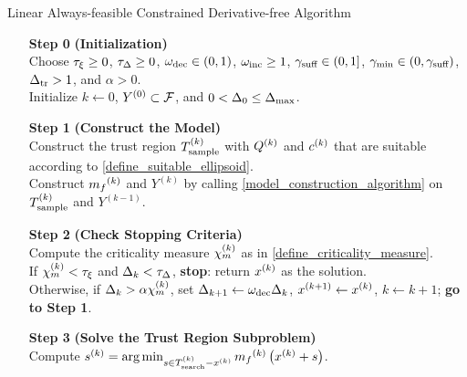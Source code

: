 \documentclass{article}
\begin{document}
{
\begin{fullwidth}[leftmargin=0in, rightmargin=0in, width=\linewidth-0.5in]
\begin{flushleft}

\begin{algorithm}[H]
    \caption{Linear Always-feasible Constrained Derivative-free Algorithm}
    \label{linearly_constrained_dfo_simple}
    \begin{itemize}
        \item[\textbf{Step 0}] \textbf{(Initialization)} \\
            Choose
            $\tau_{\xi}\ge 0$,
            $\tau_{\Delta} \ge 0$, 
            $\omega_{\text{dec}} \in (0,1)$, 
            $\omega_{\text{inc}} \ge 1$,  
            $ \gamma_{\textrm{suff}} \in (0,1]$, 
            $\gamma_{\textrm{min}} \in (0,\gamma_{\textrm{suff}})$,
            $\Delta_{\textrm{tr}} > 1$,
			and $\alpha > 0$. \\
            Initialize
            $k\gets 0$,
            $Y^{(0)} \subset {\mathcal F}$,
            and $0 < \Delta_0 \le {\Delta_{\textrm{max}}}$.
            
        \item[\textbf{Step 1}] \textbf{(Construct the Model)} \\
           Construct the trust region ${T_{\text{sample}}^{(k)}}$ with ${Q^{(k)}}$ and $c^{(k)}$ that are suitable according to \cref{define_suitable_ellipsoid}. \\
           Construct ${{m}_f}^{(k)}$ and $Y^{(k)}$ by calling \cref{model_construction_algorithm} on ${T_{\text{sample}}^{(k)}}$ and $Y^{(k-1)}$.
        
        \item[\textbf{Step 2}] \textbf{(Check Stopping Criteria)} \\
            Compute the criticality measure ${\chi_m^{(k)}}$ as in \cref{define_criticality_measure}. \\
            If $ {\chi_m^{(k)}} < \tau_{\xi} $ and $\Delta_k <\tau_{\Delta}$,  {\bf stop}: return $x^{(k)}$ as the solution.   \\
            Otherwise, if $\Delta_k > \alpha {\chi_m^{(k)}}$,   
            set 
                $\Delta_{k+1} \gets \omega_{\text{dec}}\Delta_k$, 
                ${{x}^{(k+1)}} \gets x^{(k)}$,
                $k \gets k+1$; {\bf go to Step 1}.
           
        
        \item[\textbf{Step 3}] \textbf{(Solve the Trust Region Subproblem)} \\
            Compute ${{s}^{(k)}} = \operatorname*{arg\,min}_{s \in {T_{\text{search}}^{(k)}} - x^{(k)}} {{m}_f}^{(k)}\left(x^{(k)} + s\right)$. 
            

\end{itemize}
\end{algorithm}
\end{flushleft}
\end{fullwidth}}
\end{document}
